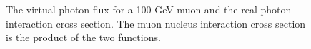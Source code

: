 \begin{figure}
	\centering
  \qquad
	\caption{The virtual photon flux for a 100 GeV muon and the real photon interaction cross section. The muon nucleus interaction cross section is the product of the two functions.}
\end{figure}

